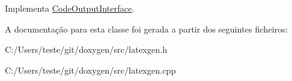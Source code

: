 Implementa \hyperlink{class_code_output_interface_a4ab86013abbf61a86e9c300eb805939a}{Code\-Output\-Interface}.



A documentação para esta classe foi gerada a partir dos seguintes ficheiros\-:\begin{DoxyCompactItemize}
\item 
C\-:/\-Users/teste/git/doxygen/src/latexgen.\-h\item 
C\-:/\-Users/teste/git/doxygen/src/latexgen.\-cpp\end{DoxyCompactItemize}
